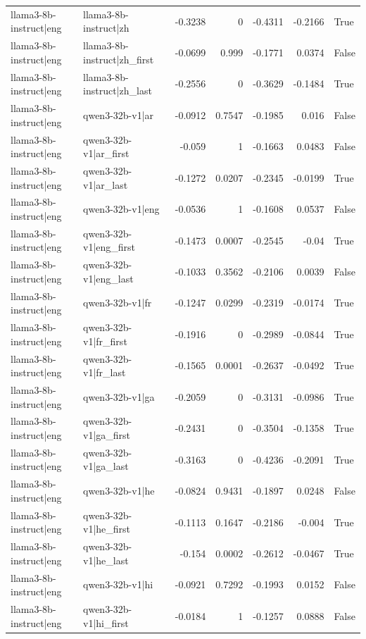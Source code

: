 \begin{table}
\begin{tabular}{l l r r r r l}
llama3-8b-instruct|eng & llama3-8b-instruct|zh & -0.3238 & 0 & -0.4311 & -0.2166 & True \\
llama3-8b-instruct|eng & llama3-8b-instruct|zh_first & -0.0699 & 0.999 & -0.1771 & 0.0374 & False \\
llama3-8b-instruct|eng & llama3-8b-instruct|zh_last & -0.2556 & 0 & -0.3629 & -0.1484 & True \\
llama3-8b-instruct|eng & qwen3-32b-v1|ar & -0.0912 & 0.7547 & -0.1985 & 0.016 & False \\
llama3-8b-instruct|eng & qwen3-32b-v1|ar_first & -0.059 & 1 & -0.1663 & 0.0483 & False \\
llama3-8b-instruct|eng & qwen3-32b-v1|ar_last & -0.1272 & 0.0207 & -0.2345 & -0.0199 & True \\
llama3-8b-instruct|eng & qwen3-32b-v1|eng & -0.0536 & 1 & -0.1608 & 0.0537 & False \\
llama3-8b-instruct|eng & qwen3-32b-v1|eng_first & -0.1473 & 0.0007 & -0.2545 & -0.04 & True \\
llama3-8b-instruct|eng & qwen3-32b-v1|eng_last & -0.1033 & 0.3562 & -0.2106 & 0.0039 & False \\
llama3-8b-instruct|eng & qwen3-32b-v1|fr & -0.1247 & 0.0299 & -0.2319 & -0.0174 & True \\
llama3-8b-instruct|eng & qwen3-32b-v1|fr_first & -0.1916 & 0 & -0.2989 & -0.0844 & True \\
llama3-8b-instruct|eng & qwen3-32b-v1|fr_last & -0.1565 & 0.0001 & -0.2637 & -0.0492 & True \\
llama3-8b-instruct|eng & qwen3-32b-v1|ga & -0.2059 & 0 & -0.3131 & -0.0986 & True \\
llama3-8b-instruct|eng & qwen3-32b-v1|ga_first & -0.2431 & 0 & -0.3504 & -0.1358 & True \\
llama3-8b-instruct|eng & qwen3-32b-v1|ga_last & -0.3163 & 0 & -0.4236 & -0.2091 & True \\
llama3-8b-instruct|eng & qwen3-32b-v1|he & -0.0824 & 0.9431 & -0.1897 & 0.0248 & False \\
llama3-8b-instruct|eng & qwen3-32b-v1|he_first & -0.1113 & 0.1647 & -0.2186 & -0.004 & True \\
llama3-8b-instruct|eng & qwen3-32b-v1|he_last & -0.154 & 0.0002 & -0.2612 & -0.0467 & True \\
llama3-8b-instruct|eng & qwen3-32b-v1|hi & -0.0921 & 0.7292 & -0.1993 & 0.0152 & False \\
llama3-8b-instruct|eng & qwen3-32b-v1|hi_first & -0.0184 & 1 & -0.1257 & 0.0888 & False \\

\end{tabular}
\end{table}
